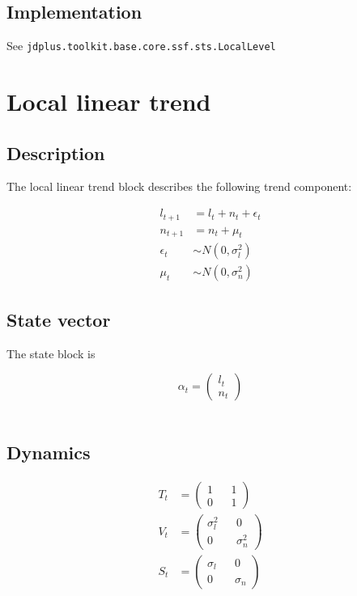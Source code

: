 \documentclass[
  letterpaper,
  DIV=11,
  numbers=noendperiod]{scrreprt}
\begin{document}
\subsection{Implementation}\label{implementation-1}

See \texttt{jdplus.toolkit.base.core.ssf.sts.LocalLevel}

\section{Local linear trend}\label{local-linear-trend}

\subsection{Description}\label{description-1}

The local linear trend block describes the following trend component:

\[
\begin{align*}
l_{t+1} &= l_t + n_t +  \epsilon_t \\
n_{t+1} &= n_t + \mu_t \\
\epsilon_t &\sim N(0, \sigma^2_l) \\
\mu_t &\sim N(0, \sigma^2_n)
\end{align*}
\]

\subsection{State vector}\label{state-vector-5}

The state block is

\[\alpha_t=
\begin{pmatrix} 
l_t \\ 
n_t  
\end{pmatrix}
\]\\

\subsection{Dynamics}\label{dynamics-5}

\[
\begin{align*}
T_t &= \begin{pmatrix} 1 && 1 \\ 0 && 1 \end{pmatrix} \\
V_t &= \begin{pmatrix} \sigma^2_l && 0 \\ 0 && \sigma^2_n \end{pmatrix} \\
S_t &= \begin{pmatrix} \sigma_l && 0 \\ 0 && \sigma_n \end{pmatrix} 
\end{align*}
\]
\end{document}
